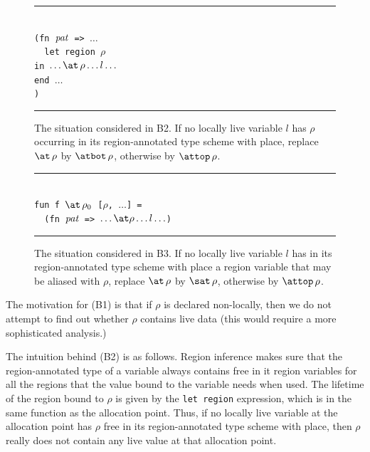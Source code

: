 \documentclass[12pt]{book}
\begin{document}
\begin{figure}[htb]
\hrule
\begin{center}
\begin{tabbing}
\\
\hskip3cm\=\tt (fn ${\it pat}$ => $\ldots$\\
       \>\ \ \=\tt let region $\rho$ \\
       \>    \>\tt in  $\ldots\at\,\rho\ldots l \ldots$\\
       \>    \>\tt end $\ldots$\\
       \>\tt )
\end{tabbing}
\end{center}
\caption{The situation considered in B2. If no locally live variable
  $l$ has $\rho$ occurring in its region-annotated type scheme with
  place, replace $\at\,\rho$ by $\atbot\,\rho$, otherwise by
  $\attop\,\rho$.}  \medskip \hrule
\label{b2.fig}
\end{figure}

\begin{figure}[htb]
\hrule
\begin{center}
\begin{tabbing}
\\
\hskip3cm\=\tt fun f $\at\,\rho_0$ [$\rho$, $\ldots$] = \\
         \>\tt \ \ \=\tt (fn ${\it pat}$ => $\ldots\at\rho\ldots l\ldots$)
\end{tabbing}
\end{center}
\caption{The situation considered in B3. If no locally live variable
  $l$ has in its region-annotated type scheme with place a region
  variable that may be aliased with $\rho$, replace $\at\,\rho$ by
  $\sat\,\rho$, otherwise by $\attop\,\rho$.}  \medskip \hrule
\label{b3.fig}
\end{figure}
The motivation for (B1) is that if $\rho$ is declared non-locally,
then we do not attempt to find out whether $\rho$ contains live data
(this would require a more sophisticated analysis.)

The intuition behind (B2) is as follows. Region inference makes sure
that the region-annotated type of a variable always contains free in
it region variables for all the regions that the value bound to the
variable needs when used. The lifetime of the region bound to $\rho$
is given by the {\tt let region} expression, which is in the same
function as the allocation point. Thus, if no locally live variable at
the allocation point has $\rho$ free in its region-annotated type
scheme with place, then $\rho$ really does not contain any live value
at that allocation point.
\end{document}
